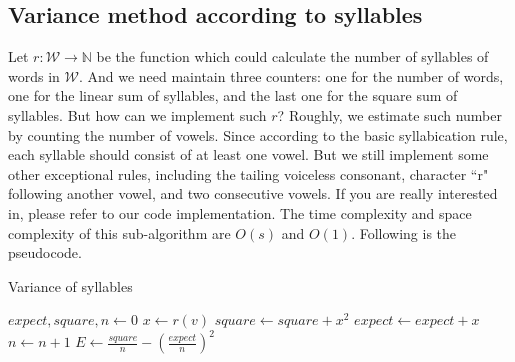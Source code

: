 \documentclass{article}
\begin{document}
        \subsection{Variance method according to syllables}
			Let $r : \mathcal{W} \rightarrow \mathbb{N}$ be the function which could calculate the number of syllables of words in $\mathcal{W}$.
			And we need maintain three counters: one for the number of words, one for the linear sum of syllables, and the last one for the
			square sum of syllables.
\newline
\newline
			But how can we implement such $r$? Roughly, we estimate such number by counting the number of vowels.
			Since according to the basic syllabication rule, each syllable should consist of at least one vowel. But we still implement some
			other exceptional rules, including the tailing voiceless consonant, character ``r" following another vowel,
			and two consecutive vowels. If you are really interested in, please refer to our code implementation.
\newline
\newline
			The time complexity and space complexity of this sub-algorithm are $O(s)$ and $O(1)$. Following is the pseudocode.
                \begin{center}
\begin{algorithm}[H]
\caption{Variance of syllables}
                \begin{algorithmic}
                                \State $expect, square, n \gets 0$
                                        \State $x \gets r(v)$
                                        \State $square \gets square + x^2$
                                        \State $expect \gets expect + x$
                                        \State $n \gets n + 1$
                                \EndFor
                                \State \Return $E \gets \frac{square}{n} - (\frac{expect}{n})^2$
                        \EndFunction
                \end{algorithmic}
\end{algorithm}
                \end{center}
\end{document}
